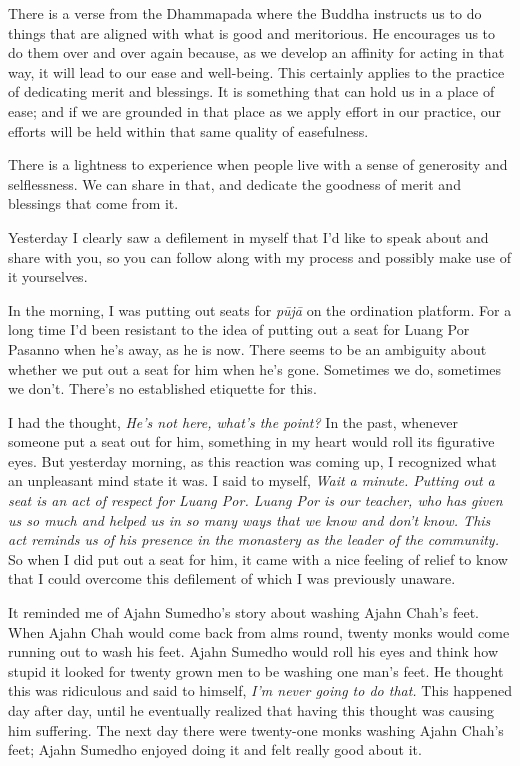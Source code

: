 There is a verse from the Dhammapada where the Buddha instructs us to 
do things that are aligned with what is good and meritorious. He 
encourages us to do them over and over again because, as we develop an 
affinity for acting in that way, it will lead to our ease and 
well-being. This certainly applies to the practice of dedicating merit 
and blessings. It is something that can hold us in a place of ease; and 
if we are grounded in that place as we apply effort in our practice, 
our efforts will be held within that same quality of easefulness.

There is a lightness to experience when people live with a sense of 
generosity and selflessness. We can share in that, and dedicate the 
goodness of merit and blessings that come from it.


Yesterday I clearly saw a defilement in myself that I'd like to speak 
about and share with you, so you can follow along with my process and 
possibly make use of it yourselves.

In the morning, I was putting out seats for \emph{pūjā} on the 
ordination platform. For a long time I'd been resistant to the idea of 
putting out a seat for Luang Por Pasanno when he's away, as he is now. 
There seems to be an ambiguity about whether we put out a seat for him 
when he's gone. Sometimes we do, sometimes we don't. There's no 
established etiquette for this.

I had the thought, \emph{He's not here, what's the point?} In the past, 
whenever someone put a seat out for him, something in my heart would 
roll its figurative eyes. But yesterday morning, as this reaction was 
coming up, I recognized what an unpleasant mind state it was. I said to 
myself, \emph{Wait a minute. Putting out a seat is an act of respect 
for Luang Por. Luang Por is our teacher, who has given us so much and 
helped us in so many ways that we know and don't know. This act reminds 
us of his presence in the monastery as the leader of the community.} So 
when I did put out a seat for him, it came with a nice feeling of 
relief to know that I could overcome this defilement of which I was 
previously unaware.

It reminded me of Ajahn Sumedho's story about washing Ajahn Chah's 
feet. When Ajahn Chah would come back from alms round, twenty monks 
would come running out to wash his feet. Ajahn Sumedho would roll his 
eyes and think how stupid it looked for twenty grown men to be washing 
one man's feet. He thought this was ridiculous and said to himself, 
\emph{I'm never going to do that.} This happened day after day, until 
he eventually realized that having this thought was causing him 
suffering. The next day there were twenty-one monks washing Ajahn 
Chah's feet; Ajahn Sumedho enjoyed doing it and felt really good about 
it.

